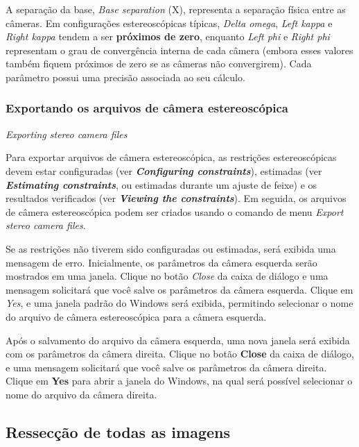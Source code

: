 \documentclass[
  12pt,
  letterpaper,
  DIV=11,
  numbers=noendperiod]{scrreprt}
\begin{document}
A separação da base, \emph{Base separation} (X), representa a separação
física entre as câmeras. Em configurações estereoscópicas típicas,
\emph{Delta omega}, \emph{Left kappa} e \emph{Right kappa} tendem a ser
\textbf{próximos de zero}, enquanto \emph{Left phi} e \emph{Right phi}
representam o grau de convergência interna de cada câmera (embora esses
valores também fiquem próximos de zero se as câmeras não convergirem).
Cada parâmetro possui uma precisão associada ao seu cálculo.

\subsubsection{\texorpdfstring{\textbf{Exportando os arquivos de câmera
estereoscópica}}{Exportando os arquivos de câmera estereoscópica}}\label{exportando-os-arquivos-de-cuxe2mera-estereoscuxf3pica}

\emph{Exporting stereo camera files}

Para exportar arquivos de câmera estereoscópica, as restrições
estereoscópicas devem estar configuradas (ver \textbf{\emph{Configuring
constraints}}), estimadas (ver \textbf{\emph{Estimating constraints}},
ou estimadas durante um ajuste de feixe) e os resultados verificados
(ver \textbf{\emph{Viewing the constraints}}). Em seguida, os arquivos
de câmera estereoscópica podem ser criados usando o comando de menu
\emph{Export stereo camera files}.

Se as restrições não tiverem sido configuradas ou estimadas, será
exibida uma mensagem de erro. Inicialmente, os parâmetros da câmera
esquerda serão mostrados em uma janela. Clique no botão \emph{Close} da
caixa de diálogo e uma mensagem solicitará que você salve os parâmetros
da câmera esquerda. Clique em \emph{Yes}, e uma janela padrão do Windows
será exibida, permitindo selecionar o nome do arquivo de câmera
estereoscópica para a câmera esquerda.

Após o salvamento do arquivo da câmera esquerda, uma nova janela será
exibida com os parâmetros da câmera direita. Clique no botão
\textbf{Close} da caixa de diálogo, e uma mensagem solicitará que você
salve os parâmetros da câmera direita. Clique em \textbf{Yes} para abrir
a janela do Windows, na qual será possível selecionar o nome do arquivo
da câmera direita.

\subsection{Ressecção de todas as
imagens}\label{ressecuxe7uxe3o-de-todas-as-imagens-1}
\end{document}
